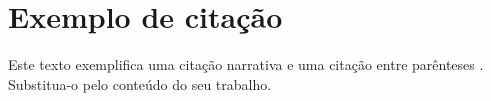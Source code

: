 \section{Exemplo de citação}

Este texto exemplifica uma citação narrativa \textcite{IEEEexample} e uma citação entre parênteses \parencite{IEEEexample}. Substitua-o pelo conteúdo do seu trabalho.
